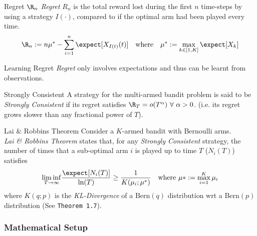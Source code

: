 \documentclass[11pt,a4paper]{article}
\begin{document}
  \begin{definition}{Regret $\R_n$}
    \textit{Regret} $R_n$ is the total reward lost during the first $n$ time-steps by using a strategy $I(\cdot)$, compared to if the optimal arm had been played every time.
    \[ \R_n:=n\mu^*-\sum_{i=1}^n\expect[X_{I(t)}(t)]\quad\text{where}\quad\mu^*:=\max_{k\in[1,K]}\expect[X_k] \]
  \end{definition}

  \begin{remark}{Learning Regret}
      \textit{Regret} only involves expectations and thus can be learnt from observations.
  \end{remark}

  \begin{definition}{Strongly Consistent}
    A strategy for the multi-armed bandit problem is said to be \textit{Strongly Consistent} if its regret satisfies $\R_T=o(T^\alpha)\ \forall\ \alpha>0$. (i.e. its regret grows slower than any fractional power of $T$).
  \end{definition}

  \begin{theorem}{Lai \& Robbins Theorem}
    Consider a $K$-armed bandit with Bernoulli arms.\\
    \textit{Lai \& Robbins Theorem} states that, for any \textit{Strongly Consistent} strategy, the number of times that a sub-optimal arm $i$ is played up to time $T$ ($N_i(T)$) satisfies
    \[ \underset{T\to\infty}{\lim\inf}\frac{\expect[N_i(T)]}{\ln(T)}\geq\frac1{K(\mu_i;\mu^*)}\quad\text{where }\mu*:=\max_{i=1}^K\mu_i \]
    where $K(q;p)$ is the \textit{KL-Divergence} of a $\text{Bern}(q)$ distribution wrt a $\text{Bern}(p)$ distribution (See \texttt{Theorem 1.7}).
  \end{theorem}

  \subsubsection*{Mathematical Setup}
\end{document}

